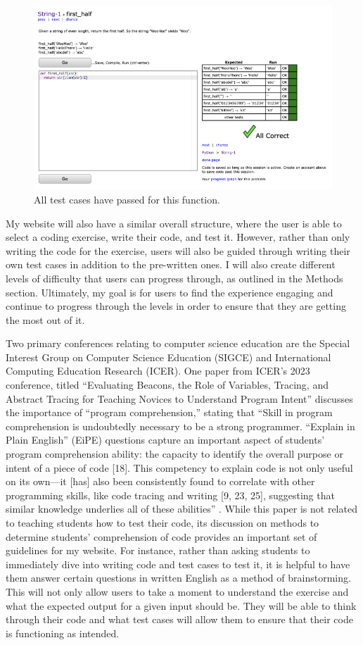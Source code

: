 \documentclass[10pt,twocolumn]{article}
\begin{document}
\begin{figure}
    \centering
    \includegraphics[width=.95\linewidth]{CodingBat3.png}
    \caption{
        All test cases have passed for this function.
    }
    \label{fig:first-page}
\end{figure}

My website will also have a similar overall structure, where the user is able to select a coding exercise, write their code, and test it. However, rather than only writing the code for the exercise, users will also be guided through writing their own test cases in addition to the pre-written ones. I will also create different levels of difficulty that users can progress through, as outlined in the Methods section. Ultimately, my goal is for users to find the experience engaging and continue to progress through the levels in order to ensure that they are getting the most out of it.

Two primary conferences relating to computer science education are the Special Interest Group on Computer Science Education (SIGCE) and International Computing Education Research (ICER). One paper from ICER’s 2023 conference, titled “Evaluating Beacons, the Role of Variables, Tracing, and Abstract Tracing for Teaching Novices to Understand Program Intent” discusses the importance of “program comprehension,” stating that “Skill in program comprehension is undoubtedly necessary to be a strong programmer. “Explain in Plain English” (EiPE) questions capture an important aspect of students’ program comprehension ability: the capacity to identify the overall purpose or intent of a piece of code [18]. This competency to explain code is not only useful on its own—it [has] also been consistently found to correlate with other programming skills, like code tracing and writing [9, 23, 25], suggesting that similar knowledge underlies all of these abilities” \cite{Teaching}. While this paper is not related to teaching students how to test their code, its discussion on methods to determine students’ comprehension of code provides an important set of guidelines for my website. For instance, rather than asking students to immediately dive into writing code and test cases to test it, it is helpful to have them answer certain questions in written English as a method of brainstorming. This will not only allow users to take a moment to understand the exercise and what the expected output for a given input should be. They will be able to think through their code and what test cases will allow them to ensure that their code is functioning as intended.
\end{document}
